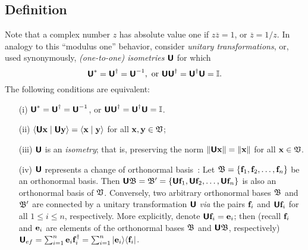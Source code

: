 \subsection {Definition}
Note that a complex number $z$ has absolute value one if $z\overline{z}=1$, or $\overline{z}=1/z$.
In analogy to this ``modulus one'' behavior,
consider {\em unitary transformations}, or, used synonymously, {\em (one-to-one) isometries}
$\textsf{\textbf{U}}$ for which
\begin{equation}
\textsf{\textbf{U}}^\ast = \textsf{\textbf{U}}^\dagger =\textsf{\textbf{U}}^{-1},
\textrm{ or } \textsf{\textbf{U}}\textsf{\textbf{U}}^\dagger =\textsf{\textbf{U}}^\dagger \textsf{\textbf{U}}={\Bbb I}.
\end{equation}
The following conditions are equivalent:
\begin{itemize}
\item[(i)]
$\textsf{\textbf{U}}^\ast = \textsf{\textbf{U}}^\dagger =\textsf{\textbf{U}}^{-1}$,
or $\textsf{\textbf{U}}\textsf{\textbf{U}}^\dagger =\textsf{\textbf{U}}^\dagger \textsf{\textbf{U}}={\Bbb I}$.
\item[(ii)]
$\langle \textsf{\textbf{U}}{\bf x}\mid \textsf{\textbf{U}}{\bf y} \rangle
=
\langle {\bf x}\mid {\bf y} \rangle$ for all ${\bf x} ,{\bf y} \in {\frak V}$;
\item[(iii)]  $\textsf{\textbf{U}}$ is an {\em isometry};
that is, preserving the norm
$\| \textsf{\textbf{U}}{\bf x}\|
=
\|{\bf x}\|$ for all ${\bf x}  \in {\frak V}$.
\item[(iv)]
$\textsf{\textbf{U}}$ represents a change of orthonormal basis~\cite{Schwinger.60}:
Let ${\frak B}=\{{\bf f}_1,  {\bf f}_2, \ldots , {\bf f}_n\}$
be an orthonormal basis.
Then
$\textsf{\textbf{U}}{\frak B}={\frak B}'=\{\textsf{\textbf{U}}{\bf f}_1, \textsf{\textbf{U}} {\bf f}_2,
\ldots ,\textsf{\textbf{U}} {\bf f}_n\}$
is also an orthonormal basis of  ${\frak V}$.
Conversely, two arbitrary orthonormal bases
${\frak B}$
and
${\frak B}'$
are connected by a unitary transformation $\textsf{\textbf{U}}$ {\it via} the pairs  ${\bf f}_i$ and $ \textsf{\textbf{U}}{\bf f}_i$
for all $1\le i \le n$, respectively.
More explicitly, denote  $\textsf{\textbf{U}} {\bf f}_i   = {\bf e}_i$; then
(recall ${\bf f}_i$ and ${\bf e}_i$ are elements of the orthonormal bases
$  {\frak B} $  and $ \textsf{\textbf{U}} {\frak B} $, respectively)
$\textsf{\textbf{U}}_{ef}   = \sum_{i=1}^n{\bf e}_i  {\bf f}_i^\dagger
 = \sum_{i=1}^n \vert {\bf e}_i \rangle \langle {\bf f}_i \vert$.
\end{itemize}

